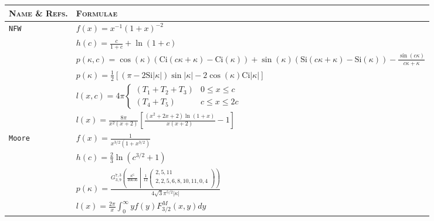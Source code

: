\documentclass[5p]{elsarticle}
\begin{document}
\begingroup
\small
\begin{table} 
\begin{tabu}{X[1l]X[3.5l]} 
\toprule[0.05cm]
\textsc{Name \& Refs.} & \textsc{Formulae} \\
\midrule[0.05cm]
\texttt{NFW} & $\displaystyle f(x) = x^{-1}(1+x)^{-2}$ \\
\citet{Navarro1997} & $\displaystyle  h(c) = \frac{c}{1+c} + \ln(1+c)$ \\
\citet{Sheth2001a} & $\displaystyle    p(\kappa,c) = \cos (\kappa) \left(\text{Ci}(c \kappa+\kappa)-\text{Ci}(\kappa)\right) 
                   +\sin (\kappa) \left(\text{Si}(c \kappa+\kappa)-\text{Si}(\kappa)\right)-\frac{\sin (c \kappa)}{c \kappa+\kappa}$ \\
\citet{Ma2000} & $\displaystyle    p(\kappa) =  \frac{1}{2} \left[(\pi -2 \text{Si}|\kappa|) \sin|\kappa|-2 \cos (\kappa) \text{Ci}| \kappa| \right]$ \\
& $\displaystyle  l(x,c) = 4\pi \begin{cases} (T_1 + T_2 +T_3) & 0\leq x \leq c \\
 	(T_4 + T_5) & c\leq x \leq 2c \end{cases}$ \\
 & $\displaystyle l(x) = \frac{8\pi}{x^2(x+2)}\left[\frac{(x^2+2x+2)\ln(1+x)}{x(x+2)} -1 \right]$ \\
 \midrule
 
\texttt{Moore}   &   $\displaystyle f(x) = \frac{1}{x^{3/2}(1+x^{3/2})}$ \\
   \citet{Moore1998}  & $\displaystyle h(c) = \frac{2}{3}\ln \left(c^{3/2}+1\right) $ \\
\citet{Ma2000} & $\displaystyle    p(\kappa) = \frac{G^{7,3}_{3,9}\left(\frac{\kappa^6}{46656}\middle|\frac{1}{12}\left(
\begin{array}{c}
 2,5,11 \\
 2,2,5,6,8,10,11,0,4 \\ 
\end{array}
\right) \right)}{4 \sqrt{3} \pi^{5/2} | \kappa |}$ \\
& $\displaystyle    l(x) = \frac{2\pi}{x}\int_0^\infty  yf(y) F^M_{3/2}(x,y) dy$ \\
\midrule


\end{tabu}
\end{table}
\end{document}
